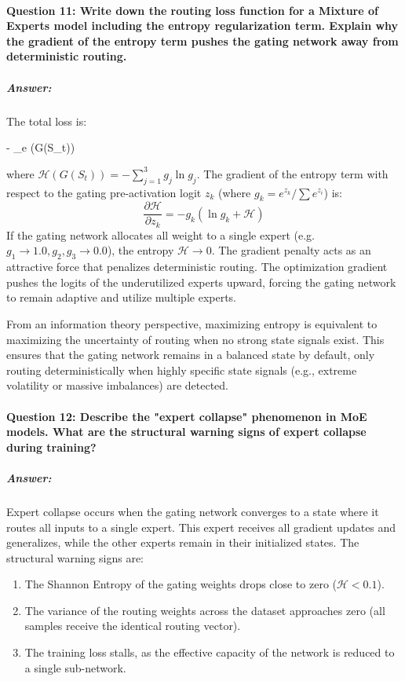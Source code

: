 \documentclass[11pt,a4paper]{article}
\begin{document}
\paragraph{Question 11: Write down the routing loss function for a Mixture of Experts model including the entropy regularization term. Explain why the gradient of the entropy term pushes the gating network away from deterministic routing.}
\subparagraph{Answer:}
The total loss is:
\begin{equation{}}
     - \gamma_e \cdot {}(G(S_t))
\end{equation{}}
where $\mathcal{H}(G(S_t)) = - \sum_{j=1}^3 g_j \ln g_j$. The gradient of the entropy term with respect to the gating pre-activation logit $z_k$ (where $g_k = e^{z_k}/\sum e^{z_i}$) is:
\begin{equation}
    \frac{\partial \mathcal{H}}{\partial z_k} = - g_k \left( \ln g_k + \mathcal{H} \right)
\end{equation}
If the gating network allocates all weight to a single expert (e.g. $g_1 \to 1.0, g_2, g_3 \to 0.0$), the entropy $\mathcal{H} \to 0$. The gradient penalty acts as an attractive force that penalizes deterministic routing. The optimization gradient pushes the logits of the underutilized experts upward, forcing the gating network to remain adaptive and utilize multiple experts.

From an information theory perspective, maximizing entropy is equivalent to maximizing the uncertainty of routing when no strong state signals exist. This ensures that the gating network remains in a balanced state by default, only routing deterministically when highly specific state signals (e.g., extreme volatility or massive imbalances) are detected.

\paragraph{Question 12: Describe the "expert collapse" phenomenon in MoE models. What are the structural warning signs of expert collapse during training?}
\subparagraph{Answer:}
Expert collapse occurs when the gating network converges to a state where it routes all inputs to a single expert. This expert receives all gradient updates and generalizes, while the other experts remain in their initialized states.
The structural warning signs are:
\begin{enumerate}
    \item The Shannon Entropy of the gating weights drops close to zero ($\mathcal{H} < 0.1$).
    \item The variance of the routing weights across the dataset approaches zero (all samples receive the identical routing vector).
    \item The training loss stalls, as the effective capacity of the network is reduced to a single sub-network.
\end{enumerate}
\end{document}
